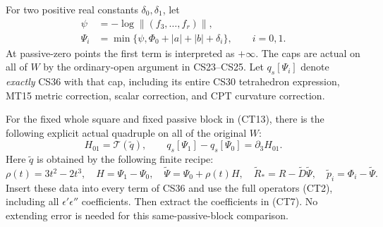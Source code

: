 For two positive real constants $\delta_0,\delta_1$, let
\[
 \begin{split}
 \psi&=-\log\|(f_3,\ldots,f_r)\|,\\
 \Psi_i&=\min\{\psi,\Phi_0+|a|+|b|+\delta_i\},\qquad i=0,1.
 \end{split}
 \tag{CT13}
\]
At passive-zero points the first term is interpreted as $+\infty$.
The caps are actual on all of $W$ by the ordinary-open argument
in CS23--CS25.  Let $q_s[\Psi_i]$ denote \emph{exactly} CS36 with
that cap, including its entire CS30 tetrahedron expression, MT15
metric correction, scalar correction, and CPT curvature correction.

\begin{theorem}
For the fixed whole square and fixed passive block in (CT13), there
is the following explicit actual quadruple on all of the original $W$:
\[
       H_{01}=\mathcal T(\widetilde q),\qquad
       q_s[\Psi_1]-q_s[\Psi_0]=\partial_3H_{01}.
 \tag{CT14}
\]
Here $\widetilde q$ is obtained by the following finite recipe:
\[
 \rho(t)=3t^2-2t^3,\quad
 H=\Psi_1-\Psi_0,\quad
 \widetilde\Psi=\Psi_0+\rho(t)H,\quad
 \widetilde R_*=R-\widetilde D\widetilde\Psi,\quad
 \widetilde p_i=\Phi_i-\widetilde\Psi.
 \tag{CT15}
\]
Insert these data into every term of CS36 and use the full
operators (CT2), including all $\epsilon'\epsilon''$ coefficients.
Then extract the coefficients in (CT7).  No extending error is
needed for this same-passive-block comparison.
\end{theorem}

